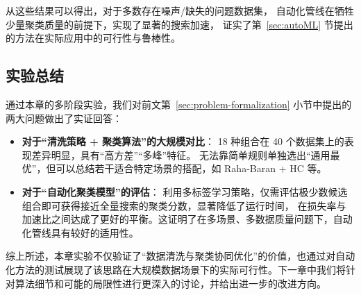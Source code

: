\documentclass[10pt]{article} %
\numberwithin{equation}{section}
\begin{document}
从这些结果可以得出，对于多数存在噪声/缺失的问题数据集，
自动化管线在牺牲少量聚类质量的前提下，实现了显著的搜索加速，
证实了第~\ref{sec:autoML} 节提出的方法在实际应用中的可行性与鲁棒性。

\subsection{实验总结}
\label{sec:exp_summary}

通过本章的多阶段实验，我们对前文第~\ref{sec:problem-formalization} 小节中提出的两大问题做出了实证回答：
\begin{itemize}
    \item \textbf{对于“清洗策略 + 聚类算法”的大规模对比}：
    18 种组合在 40 个数据集上的表现差异明显，具有“高方差”“多峰”特征。
    无法靠简单规则单独选出“通用最优”，但可以总结若干适合特定场景的搭配，如 Raha-Baran + HC 等。
    \item \textbf{对于“自动化聚类模型”的评估}：
    利用多标签学习策略，仅需评估极少数候选组合即可获得接近全量搜索的聚类分数，显著降低了运行时间，
    在损失率与加速比之间达成了更好的平衡。这证明了在多场景、多数据质量问题下，自动化管线具有较好的适用性。
\end{itemize}

综上所述，本章实验不仅验证了“数据清洗与聚类协同优化”的价值，也通过对自动化方法的测试展现了该思路在大规模数据场景下的实际可行性。下一章中我们将针对算法细节和可能的局限性进行更深入的讨论，并给出进一步的改进方向。



\end{document}

